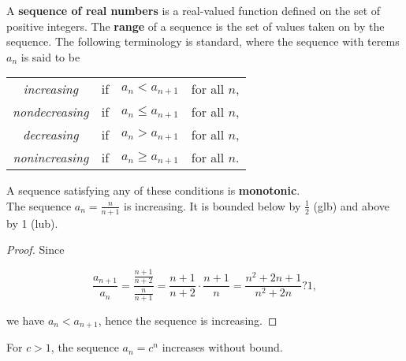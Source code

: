         A \textbf{sequence of real numbers} is a real-valued function defined on the set of positive integers. The \textbf{range} of a sequence is the set of values taken on by the sequence. The following terminology
        is standard, where the sequence with terems $a_n$ is said to be

        \begin{center}
            \begin{tabular}{cccc}
                \textit{increasing}     & if    & $a_n < a_{n+1}$   & for all $n$, \\
                \textit{nondecreasing}  & if    & $a_n \leq a_{n+1}$& for all $n$, \\
                \textit{decreasing}     & if    & $a_n > a_{n+1}$   & for all $n$, \\
                \textit{nonincreasing}  & if    & $a_n \geq a_{n+1}$& for all $n$.
            \end{tabular}
        \end{center}

        A sequence satisfying any of these conditions is \textbf{monotonic}. \\

        \textit{} The sequence $a_n = \frac{n}{n+1}$ is increasing. It is bounded below by $\frac{1}{2}$ (glb) and above by 1 (lub).

        \begin{proof}
            Since

            \[
                \frac{a_{n+1}}{a_n} = \frac{\frac{n+1}{n+2}}{\frac{n}{n+1}} = \frac{n+1}{n+2}\cdot\frac{n+1}{n} = \frac{n^2 + 2n + 1}{n^2 + 2n} ? 1,
            \]

            we have $a_n < a_{n+1}$, hence the sequence is increasing.
        \end{proof}

        \textit{} For $c > 1$, the sequence $a_n = c^n$ increases without bound.

